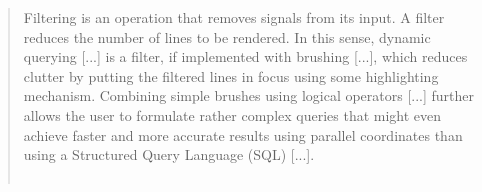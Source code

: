 	\begin{quotation}\vspace{-0.5cm}
		\og Filtering is an operation that removes signals from its input. A filter reduces the number of lines to be rendered. In this sense, dynamic querying [...] is a filter, if implemented with brushing [...], which reduces clutter by putting the filtered lines in focus using some highlighting mechanism. Combining simple brushes using logical operators [...] further allows the user to formulate rather complex queries that might even achieve faster and more accurate results using parallel coordinates than using a Structured Query Language (SQL) [...].\fg{}\\
		\mbox{}~ \hfill \cite[p. 13]{heinrich_state_2013}
	\end{quotation}
	
